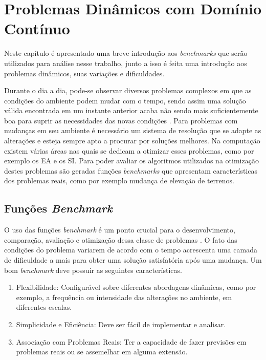 \chapter{Problemas Dinâmicos com Domínio Contínuo}
\label{ch:problemas}
Neste capítulo é apresentado uma breve introdução aos \textit{benchmarks} que serão utilizados para análise nesse trabalho, junto a isso é feita uma introdução aos problemas dinâmicos, suas variações e dificuldades.

Durante o dia a dia, pode-se observar diversos problemas complexos em que as condições do ambiente podem mudar com o tempo, sendo assim uma solução válida encontrada em um instante anterior acaba não sendo mais suficientemente boa para suprir as necessidades das novas condições \cite{branke2012evolutionary}. Para problemas com mudanças em seu ambiente é necessário um sistema de resolução que se adapte as alterações e esteja sempre apto a procurar por soluções melhores. Na computação existem várias áreas nas quais se dedicam a otimizar esses problemas, como por exemplo os EA e os SI. Para poder avaliar os algoritmos utilizados na otimização destes problemas são geradas funções \textit{benchmarks} que apresentam características dos problemas reais, como por exemplo mudança de elevação de terrenos.

\section{Funções \textit{Benchmark}}
\label{sec:revisao_benchmark}
O uso das funções \textit{benchmark} é um ponto crucial para o desenvolvimento, comparação, avaliação e otimização dessa classe de problemas \cite{evolution_dynamic}. O fato das condições do problema variarem de acordo com o tempo acrescenta uma camada de dificuldade a mais para obter uma solução satisfatória após uma mudança. Um bom \textit{benchmark} deve possuir as seguintes características.

\begin{enumerate}  
\item Flexibilidade: Configurável sobre diferentes abordagens dinâmicas, como por exemplo, a frequência ou intensidade das alterações no ambiente, em diferentes escalas.

\item Simplicidade e Eficiência: Deve ser fácil de implementar e analisar.

\item Associação com Problemas Reais: Ter a capacidade de fazer previsões em problemas reais ou se assemelhar em alguma extensão.
\end{enumerate}


